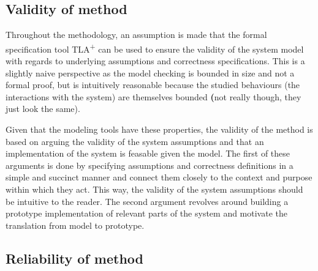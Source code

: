 



\subsection{Validity of method}
\label{sec:validtyOfMethod}

Throughout the methodology, an assumption is made that the formal specification tool TLA\textsuperscript+ can be used to ensure the validity of the system model with regards to underlying assumptions and correctness specifications. This is a slightly naive perspective as the model checking is bounded in size and not a formal proof, but is intuitively reasonable because the studied behaviours (the interactions with the system) are themselves bounded \textbf({not really though, they just look the same)}.

Given that the modeling tools have these properties, the validity of the method is based on arguing the validity of the system assumptions and that an implementation of the system is feasable given the model. The first of these arguments is done by specifying assumptions and correctness definitions in a simple and succinct manner and connect them closely to the context and purpose within which they act. This way, the validity of the system assumptions should be intuitive to the reader. The second argument revolves around building a prototype implementation of relevant parts of the system and motivate the translation from model to prototype.

\subsection{Reliability of method}
\label{sec:reliabilityOfMethod}

